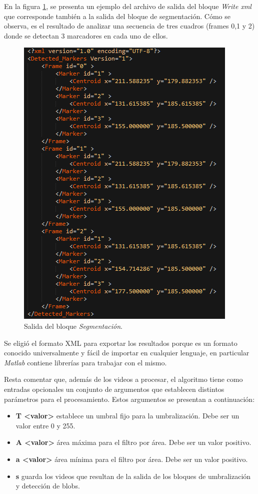En la figura \ref{salidaxml}, se presenta un ejemplo del archivo de salida del bloque \emph{Write xml} que corresponde también a la salida del bloque de segmentación. Cómo se observa, es el resultado de analizar una secuencia de tres cuadros (frames 0,1 y 2) donde se detectan 3 marcadores en cada uno de ellos.

\begin{figure}[H]
\begin{center}
\includegraphics[scale=0.9]{img/salidaXml.png}
\end{center}
\caption{Salida del bloque \emph{Segmentación}.}
\label{salidaxml}
\end{figure}


 Se eligió el formato XML\cite{xml} para exportar los resultados porque es un formato conocido universalmente y fácil de importar en cualquier lenguaje, en particular \emph{Matlab} contiene librerías para trabajar con el mismo.

 Resta comentar que, además de los videos a procesar, el algoritmo tiene como entradas opcionales un conjunto de argumentos que establecen distintos parámetros para el procesamiento. Estos argumentos se presentan a continuación:

 \begin{itemize}
\item \textbf{T <valor>} establece un umbral fijo para la umbralización. Debe ser un valor entre 0 y 255.
\item \textbf{A <valor>} área máxima para el filtro por área. Debe ser un valor positivo.
\item \textbf{a <valor>} área mínima para el filtro por área. Debe ser un valor positivo.
\item \textbf{s} guarda los videos que resultan de la salida de los bloques de umbralización y detección de blobs.
 \end{itemize}

